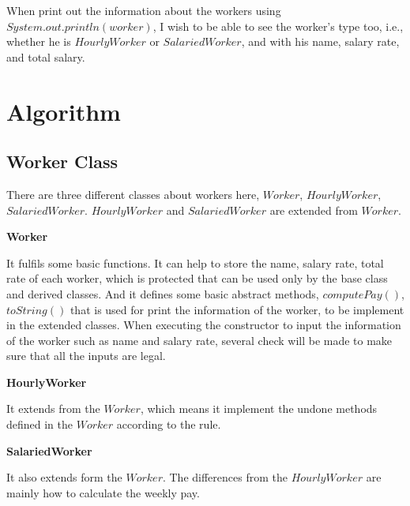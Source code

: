 \documentclass{article}
\begin{document}
When print out the information about the workers using $System.out.println(worker)$, I wish to be able to see the worker's type too, i.e., whether he is $HourlyWorker$ or $SalariedWorker$, and with his name, salary rate, and total salary.



\section{Algorithm}

\subsection{Worker Class}
There are three different classes about workers here, $Worker$, $HourlyWorker$, $SalariedWorker$. $HourlyWorker$ and $SalariedWorker$ are extended from $Worker$.
\begin{compactitem}
\item \textbf{Worker}

It fulfils some basic functions. It can help to store the name, salary rate, total rate of each worker, which is protected that can be used only by the base class and derived classes. And it defines some basic abstract methods, $computePay()$, $toString()$ that is used for print the information of the worker, to be implement in the extended classes. When executing the constructor to input the information of the worker such as name and salary rate, several check will be made to make sure that all the inputs are legal.

\item \textbf{HourlyWorker}

It extends from the $Worker$, which means it implement the undone methods defined in the $Worker$ according to the rule.
\item \textbf{SalariedWorker}

It also extends form the $Worker$. The differences from the $HourlyWorker$ are mainly how to calculate the weekly pay.
\end{compactitem}
\end{document}
